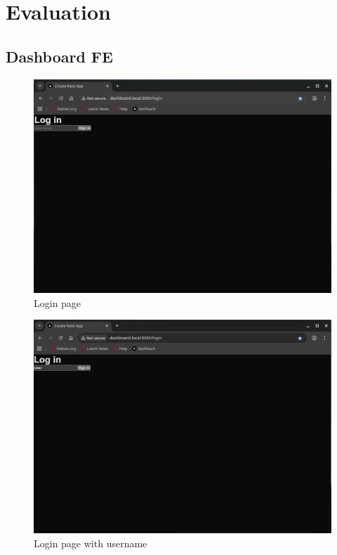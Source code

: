 \documentclass[11pt, a4paper, oneside, listof=totoc]{scrartcl}
\begin{document}
        \clearpage
        
        \section{Evaluation}\label{app:eval}
            \subsection{Dashboard FE}\label{appsub:dashboardfe}
                \begin{figure}[h!]
                    \centering
                    \includegraphics[width=\textwidth]{screenshots/eval/dashboardfe/dashboardfe-login-page.png}
                    \caption{Login page}\label{fig:dashboardfe-login-page}
                \end{figure}

                \begin{figure}[h!]
                    \centering
                    \includegraphics[width=\textwidth]{screenshots/eval/dashboardfe/dashboardfe-login-page-with-username.png}
                    \caption{Login page with username}\label{fig:dashboardfe-login-page-with-username}
                \end{figure}
\end{document}
